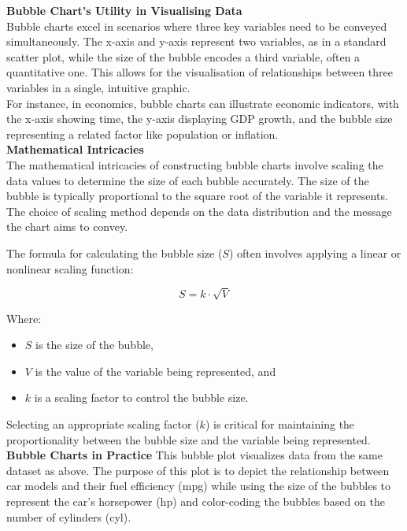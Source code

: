 \documentclass{article}\usepackage[]{graphicx}\usepackage[]{xcolor}
\begin{document}
\textbf{Bubble Chart's Utility in Visualising Data}\\
Bubble charts excel in scenarios where three key variables need to be conveyed simultaneously. The x-axis and y-axis represent two variables, as in a standard scatter plot, while the size of the bubble encodes a third variable, often a quantitative one. This allows for the visualisation of relationships between three variables in a single, intuitive graphic.\\
For instance, in economics, bubble charts can illustrate economic indicators, with the x-axis showing time, the y-axis displaying GDP growth, and the bubble size representing a related factor like population or inflation. \\

\textbf{Mathematical Intricacies}\\
The mathematical intricacies of constructing bubble charts involve scaling the data values to determine the size of each bubble accurately. The size of the bubble is typically proportional to the square root of the variable it represents. The choice of scaling method depends on the data distribution and the message the chart aims to convey.

The formula for calculating the bubble size (\(S\)) often involves applying a linear or nonlinear scaling function:

\[
S = k \cdot \sqrt{V}
\]

Where:
\begin{itemize}
\item \(S\) is the size of the bubble,
\item \(V\) is the value of the variable being represented, and
\item \(k\) is a scaling factor to control the bubble size.
\end{itemize}

Selecting an appropriate scaling factor (\(k\)) is critical for maintaining the proportionality between the bubble size and the variable being represented.\\

\textbf{Bubble Charts in Practice}
 This bubble plot visualizes data from the same dataset as above. The purpose of this plot is to depict the relationship between car models and their fuel efficiency (mpg) while using the size of the bubbles to represent the car's horsepower (hp) and color-coding the bubbles based on the number of cylinders (cyl).
\end{document}
